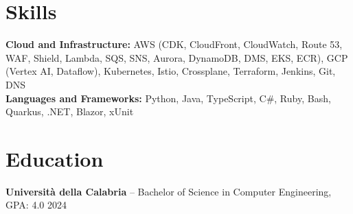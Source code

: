 \documentclass[11pt]{article}       %
\begin{document}
\vspace{-18.5pt}

\section*{Skills}
\textbf{Cloud and Infrastructure:} AWS (CDK, CloudFront, CloudWatch, Route 53, WAF, Shield, Lambda, SQS, SNS, Aurora, DynamoDB, DMS, EKS, ECR), GCP (Vertex AI, Dataflow), Kubernetes, Istio, Crossplane, Terraform, Jenkins, Git, DNS \\
\textbf{Languages and Frameworks:} Python, Java, TypeScript, C\#, Ruby, Bash, Quarkus, .NET, Blazor, xUnit

\vspace{-6.5pt}

\section*{Education}
\textbf{Università della Calabria} -- Bachelor of Science in Computer Engineering, GPA: 4.0 \hfill 2024
\end{document}
